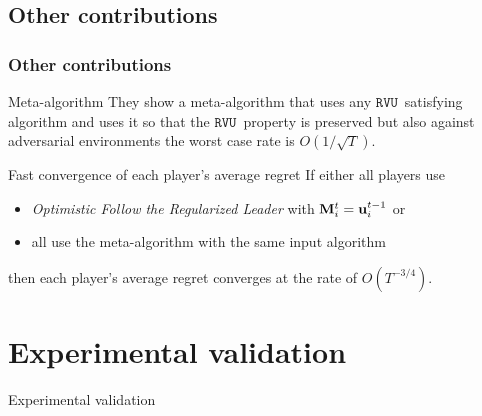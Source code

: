 \documentclass{beamer}
\renewcommand{\vec}[1]{\ensuremath{{\bf #1}}}
\newcommand{\myprop}{\ensuremath{\texttt{RVU}}}
\begin{document}
\subsection{Other contributions}
\begin{frame}
 	\frametitle{Other contributions}
 	
 	
 	\begin{block}{Meta-algorithm}
 		They show a meta-algorithm that uses any \myprop~satisfying algorithm and uses it so that
 		the \myprop~property is preserved but also against adversarial environments the worst case rate is $O(1/\sqrt{T})$.
 	\end{block}
 	\pause
 	
 	\begin{block}{Fast convergence of each player's average regret}
 		If either all players use \\
 		\begin{itemize}
  		\item \textit{Optimistic Follow the Regularized Leader} with $\vec{M}_i^t = \vec{u}_i^{t-1}$ or
 			\item all use the meta-algorithm with the same input algorithm
 		\end{itemize}
 		then each player's average regret converges at the rate of $ O(T^{-3/4})$.
 	\end{block}
 	
\end{frame}









\section{Experimental validation}
\begin{frame}[c]
	\begin{center}
		\Huge Experimental validation
	\end{center}
\end{frame}
\end{document}

